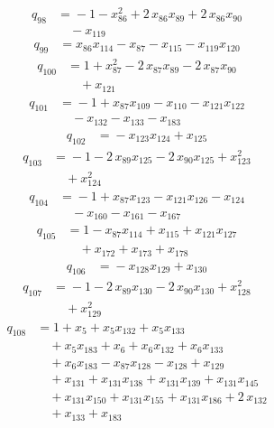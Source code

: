 \begin{align*}
q_{98} &={}-1 -x_{86}^{2} +2\,x_{86}x_{89} +2\,x_{86}x_{90}\\
&\quad -x_{119}
\end{align*}
\begin{align*}
q_{99} &={}x_{86}x_{114} -x_{87} -x_{115} -x_{119}x_{120}
\end{align*}
\begin{align*}
q_{100} &={}1 +x_{87}^{2} -2\,x_{87}x_{89} -2\,x_{87}x_{90}\\
&\quad +x_{121}
\end{align*}
\begin{align*}
q_{101} &={}-1 +x_{87}x_{109} -x_{110} -x_{121}x_{122}\\
&\quad -x_{132} -x_{133} -x_{183}
\end{align*}
\begin{align*}
q_{102} &={}-x_{123}x_{124} +x_{125}
\end{align*}
\begin{align*}
q_{103} &={}-1 -2\,x_{89}x_{125} -2\,x_{90}x_{125} +x_{123}^{2}\\
&\quad +x_{124}^{2}
\end{align*}
\begin{align*}
q_{104} &={}-1 +x_{87}x_{123} -x_{121}x_{126} -x_{124}\\
&\quad -x_{160} -x_{161} -x_{167}
\end{align*}
\begin{align*}
q_{105} &={}1 -x_{87}x_{114} +x_{115} +x_{121}x_{127}\\
&\quad +x_{172} +x_{173} +x_{178}
\end{align*}
\begin{align*}
q_{106} &={}-x_{128}x_{129} +x_{130}
\end{align*}
\begin{align*}
q_{107} &={}-1 -2\,x_{89}x_{130} -2\,x_{90}x_{130} +x_{128}^{2}\\
&\quad +x_{129}^{2}
\end{align*}
\begin{align*}
q_{108} &={}1 +x_{5} +x_{5}x_{132} +x_{5}x_{133}\\
&\quad +x_{5}x_{183} +x_{6} +x_{6}x_{132} +x_{6}x_{133}\\
&\quad +x_{6}x_{183} -x_{87}x_{128} -x_{128} +x_{129}\\
&\quad +x_{131} +x_{131}x_{138} +x_{131}x_{139} +x_{131}x_{145}\\
&\quad +x_{131}x_{150} +x_{131}x_{155} +x_{131}x_{186} +2\,x_{132}\\
&\quad +x_{133} +x_{183}
\end{align*}
